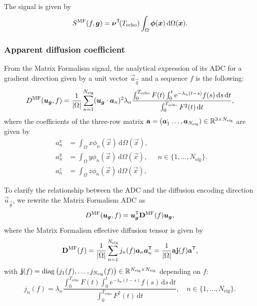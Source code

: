 \documentclass[a4paper]{article}
\begin{document}
The signal is given by
\begin{equation}
    S^\text{MF}(f, \bm{g}) = \bm{\nu}^{\mathsf{T}}\!(T_\text{echo}) \int_\Omega \bm{\phi}(\bm{x}) \, \mathrm{d} \Omega(\bm{x}).
\end{equation}




\subsubsection{Apparent diffusion coefficient}

From the Matrix Formalism signal, the analytical expression of its ADC for a gradient direction given by a unit vector $\vec{u}_{\vec{g}}$ and a sequence $f$ is the following:
\begin{equation*} \label{eq:mf_adc}
    D^\text{MF}(\bm{u}_{\bm{g}}, f) = \frac{1}{|\Omega|} \sum_{n = 1}^{N_\text{eig}} (\bm{u}_{\bm{g}} \cdot \bm{a}_n)^2 \lambda_n \frac{\int_0^{T_\text{echo}} F(t) \int_0^t \mathrm{e}^{-\lambda_n(t - s)} f(s) \, \mathrm{d} s \, \mathrm{d} t}{ \int_0^{T_\text{echo}} F^2(t) \, \mathrm{d} t},
\end{equation*}
where the coefficients of the three-row matrix $\mathbf{a} = (\bm{a}_1^, \dots, \bm{a}_{N_\text{eig}}) \in \mathbb{R}^{3 \times N_\text{eig}}$ are given by
\begin{equation}
    \begin{split}
        a_n^x & = \int_{\Omega} x \phi_n(\vec{x}) \, \mathrm{d} \Omega(\vec{x}), \\
        a_n^y & = \int_{\Omega} y \phi_n(\vec{x}) \, \mathrm{d} \Omega(\vec{x}), \\
        a_n^z & = \int_{\Omega} z \phi_n(\vec{x}) \, \mathrm{d} \Omega(\vec{x}),
    \end{split}
    \quad n \in \{1, \dots, N_\text{eig}\}.
\end{equation}

To clarify the relationship between the ADC and the diffusion encoding direction $\vec{u}_{\vec{g}}$, we rewrite the Matrix Formalism ADC as
\begin{equation}
    D^\text{MF}(\bm{u}_{\bm{g}}, f) = \bm{u}_{\bm{g}}^{\mathsf{T}} \mathbf{D}^{\text{MF}}(f) \bm{u}_{\bm{g}},
\end{equation}
where the Matrix Formalism effective diffusion tensor is given by
\begin{align}
    \label{eq:dmf}
    \mathbf{D}^{\text{MF}}(f) = \frac{1}{|\Omega|} \sum_{n = 1}^{N_\text{eig}} j_n(f) \bm{a}_n \bm{a}_n^{\mathsf{T}} = \frac{1}{|\Omega|} \mathbf{a} \mathbf{j}(f) \mathbf{a}^{\mathsf{T}},
\end{align}
with $\mathbf{j}(f) = \operatorname{diag}\left(j_1(f), \dots, j_{N_\text{eig}}(f)\right) \in \mathbb{R}^{N_\text{eig} \times N_\text{eig}}$ depending on $f$:
\begin{equation}
    j_n(f) = \lambda_n \frac{\int_0^{T_\text{echo}} F(t) \int_0^t e^{-\lambda_n(t - s)} f(s) \, \mathrm{d} s \, \mathrm{d} t}{\int_0^{T_\text{echo}} F^2(t) \, \mathrm{d} t}, \quad n \in \{1, \dots, N_\text{eig}\}.
\end{equation}
\end{document}

